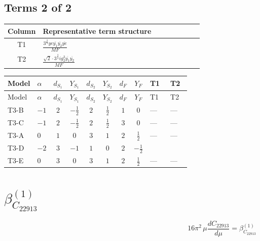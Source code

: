 \documentclass[8pt]{article}
\begin{document}
\begin{landscape}
\subsection*{Terms 2 of 2}
\begin{center}
\begin{tabular}{@{}c >{\raggedright\arraybackslash}p{0.82\linewidth}@{}}
\toprule
Column & Representative term structure \\
\midrule
T1 & \(\displaystyle \frac{3^{\frac{3}{4}} ye \overline{y_{1}} \overline{y_{2}} \overline{ye}}{MF}\) \\
\midrule
T2 & \(\displaystyle \frac{\sqrt{2} \cdot 3^{\frac{3}{4}} i g_{2}^{2} \overline{y_{1}} \overline{y_{2}}}{MF}\) \\
\midrule
\bottomrule
\end{tabular}
\end{center}
\smallskip
\tiny
\begin{longtable}{@{}llcccccc >{\raggedright\arraybackslash}p{0.21\linewidth} >{\raggedright\arraybackslash}p{0.21\linewidth}@{}}
\toprule
Model & $\alpha$ & $d_{S_1}$ & $Y_{S_1}$ & $d_{S_2}$ & $Y_{S_2}$ & $d_F$ & $Y_F$ & T1 & T2 \\
\midrule
\endfirsthead
\toprule
Model & $\alpha$ & $d_{S_1}$ & $Y_{S_1}$ & $d_{S_2}$ & $Y_{S_2}$ & $d_F$ & $Y_F$ & T1 & T2 \\
\midrule
\endhead
T3-B & $-1$ & $2$ & $-\frac{1}{2}$ & $2$ & $\frac{1}{2}$ & $1$ & $0$ & --- & --- \\
\midrule
T3-C & $-1$ & $2$ & $-\frac{1}{2}$ & $2$ & $\frac{1}{2}$ & $3$ & $0$ & --- & --- \\
\midrule
T3-A & $0$ & $1$ & $0$ & $3$ & $1$ & $2$ & $\frac{1}{2}$ & --- & --- \\
\midrule
T3-D & $-2$ & $3$ & $-1$ & $1$ & $0$ & $2$ & $-\frac{1}{2}$ & \scriptsize\adjustbox{max width=\linewidth}{$\begin{gathered} - \frac{3^{\frac{3}{4}} ye \overline{y_{1}} \overline{y_{2}} \overline{ye}}{12 MF}\end{gathered}$} & \scriptsize\adjustbox{max width=\linewidth}{$\begin{gathered} - \frac{\sqrt{2} \cdot 3^{\frac{3}{4}} i g_{2}^{2} \overline{y_{1}} \overline{y_{2}}}{3 MF}\end{gathered}$} \\
\midrule
T3-E & $0$ & $3$ & $0$ & $3$ & $1$ & $2$ & $\frac{1}{2}$ & --- & --- \\
\midrule
\bottomrule
\end{longtable}
\clearpage
\section*{$\beta_{C_{22913}}^{(1)}$}
\[16\pi^2\,\mu\frac{d C_{22913}}{d\mu}=\beta_{C_{22913}}^{(1)}\]

\end{landscape}
\end{document}
